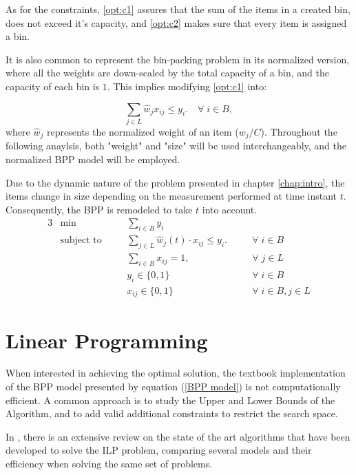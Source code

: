 As for the constraints, \ref{opt:c1} assures that the sum of the items in a
created bin, does not exceed it's capacity, and \ref{opt:c2} makes sure that every
item is assigned a bin. 

It is also common to represent the bin-packing problem in its normalized
version, where all the weights are down-scaled by the total capacity of a bin,
and the capacity of each bin is $1$. This implies modifying \ref{opt:c1} into:

\begin{equation}
    \sum_{j \in L} \hat w_j x_{ij} \leq y_i. \quad \forall \; i \in B,
\end{equation}
where \(\hat w_j\) represents the normalized weight of an item ($w_j/C$).
Throughout the following anaylsis, both "weight" and "size" will be used
interchangeably, and the normalized BPP model will be employed.

Due to the dynamic nature of the problem presented in chapter \ref{chap:intro},
the items change in size depending on the measurement performed at time instant
$t$. Consequently, the BPP is remodeled to take $t$ into account.
\begin{alignat}{3}
\label{time_variable_bpp}
    &\min       &&\sum_{i \in B} y_i && \\
    &\text{subject to} \quad
                && \sum_{j \in L} \hat w_j(t) \cdot x_{ij} \leq y_i. \quad      && \forall \; i \in B \label{opt:c1} \\
    &           && \sum_{i \in B} x_{ij} = 1, \quad                 && \forall \; j \in L \label{opt:c2} \\
    &           && y_i \in \{0, 1\}                                 && \forall \; i \in B \\
    &           && x_{ij} \in \{0,1\}                               && \forall \; i \in B, j \in L
\end{alignat}

\section{Linear Programming}

When interested in achieving the optimal solution, the textbook implementation
of the BPP model presented by equation (\ref{BPP model}) is not computationally
efficient. A common approach is to study the Upper and Lower Bounds of the
Algorithm, and to add valid additional constraints to restrict the search space.

In \cite{delorme2016bin}, there is an extensive review on the state of the art
algorithms that have been developed to solve the ILP problem, comparing several
models and their efficiency when solving the same set of problems. 

